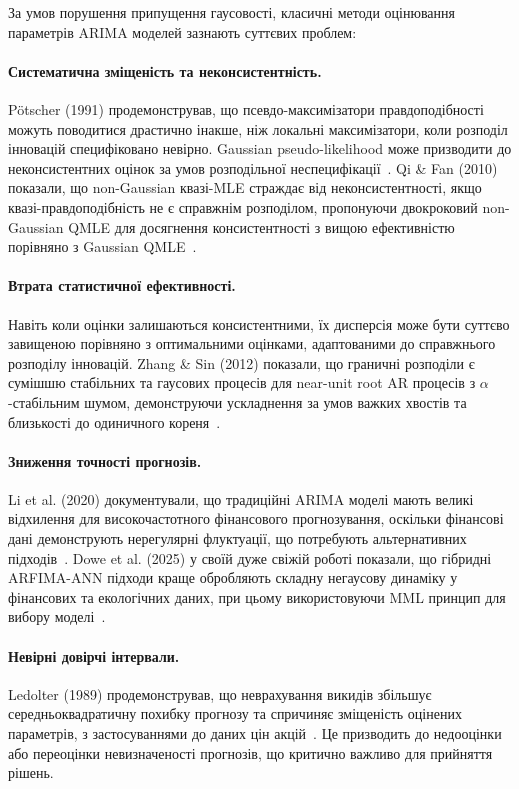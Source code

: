\documentclass[12pt,a4paper]{article}
\begin{document}
За умов порушення припущення гаусовості, класичні методи оцінювання параметрів ARIMA моделей зазнають суттєвих проблем:

\paragraph{Систематична зміщеність та неконсистентність.} Pötscher (1991) продемонстрував, що псевдо-максимізатори правдоподібності можуть поводитися драстично інакше, ніж локальні максимізатори, коли розподіл інновацій специфіковано невірно. Gaussian pseudo-likelihood може призводити до неконсистентних оцінок за умов розподільної неспецифікації~\cite{potscher1991noninvertibility}. Qi \& Fan (2010) показали, що non-Gaussian квазі-MLE страждає від неконсистентності, якщо квазі-правдоподібність не є справжнім розподілом, пропонуючи двокроковий non-Gaussian QMLE для досягнення консистентності з вищою ефективністю порівняно з Gaussian QMLE~\cite{qi2010non}.

\paragraph{Втрата статистичної ефективності.} Навіть коли оцінки залишаються консистентними, їх дисперсія може бути суттєво завищеною порівняно з оптимальними оцінками, адаптованими до справжнього розподілу інновацій. Zhang \& Sin (2012) показали, що граничні розподіли є сумішшю стабільних та гаусових процесів для near-unit root AR процесів з $\alpha$-стабільним шумом, демонструючи ускладнення за умов важких хвостів та близькості до одиничного кореня~\cite{zhang2012maximum}.

\paragraph{Зниження точності прогнозів.} Li et al. (2020) документували, що традиційні ARIMA моделі мають великі відхилення для високочастотного фінансового прогнозування, оскільки фінансові дані демонструють нерегулярні флуктуації, що потребують альтернативних підходів~\cite{li2020forecasting}. Dowe et al. (2025) у своїй дуже свіжій роботі показали, що гібридні ARFIMA-ANN підходи краще обробляють складну негаусову динаміку у фінансових та екологічних даних, при цьому використовуючи MML принцип для вибору моделі~\cite{dowe2025novel}.

\paragraph{Невірні довірчі інтервали.} Ledolter (1989) продемонстрував, що неврахування викидів збільшує середньоквадратичну похибку прогнозу та спричиняє зміщеність оцінених параметрів, з застосуваннями до даних цін акцій~\cite{ledolter1989inference}. Це призводить до недооцінки або переоцінки невизначеності прогнозів, що критично важливо для прийняття рішень.
\end{document}
